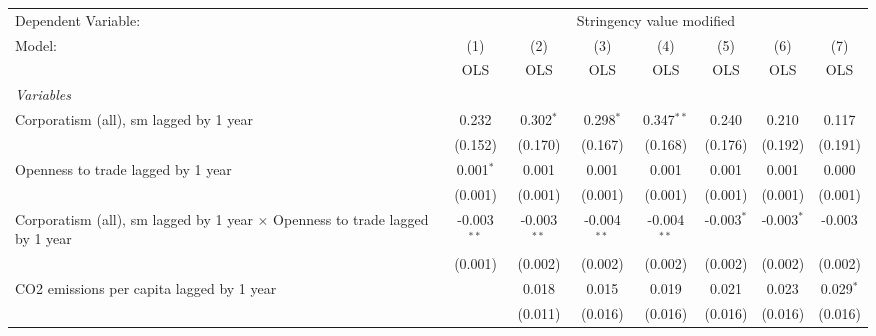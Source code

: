 
\begingroup
\centering
\begin{tabular}{lccccccc}
   \toprule
   Dependent Variable: & \multicolumn{7}{c}{Stringency value modified}\\
   Model:                                                                              & (1)           & (2)           & (3)           & (4)           & (5)          & (6)          & (7)\\  
                                                                                       &  OLS          & OLS           & OLS           & OLS           & OLS          & OLS          & OLS\\  
   \midrule
   \emph{Variables}\\
   Corporatism (all), sm lagged by 1 year                                              & 0.232         & 0.302$^{*}$   & 0.298$^{*}$   & 0.347$^{**}$  & 0.240        & 0.210        & 0.117\\   
                                                                                       & (0.152)       & (0.170)       & (0.167)       & (0.168)       & (0.176)      & (0.192)      & (0.191)\\   
   Openness to trade lagged by 1 year                                                  & 0.001$^{*}$   & 0.001         & 0.001         & 0.001         & 0.001        & 0.001        & 0.000\\   
                                                                                       & (0.001)       & (0.001)       & (0.001)       & (0.001)       & (0.001)      & (0.001)      & (0.001)\\   
   Corporatism (all), sm lagged by 1 year $\times$ Openness to trade lagged by 1 year  & -0.003$^{**}$ & -0.003$^{**}$ & -0.004$^{**}$ & -0.004$^{**}$ & -0.003$^{*}$ & -0.003$^{*}$ & -0.003\\   
                                                                                       & (0.001)       & (0.002)       & (0.002)       & (0.002)       & (0.002)      & (0.002)      & (0.002)\\   
   CO2 emissions per capita lagged by 1 year                                           &               & 0.018         & 0.015         & 0.019         & 0.021        & 0.023        & 0.029$^{*}$\\   
                                                                                       &               & (0.011)       & (0.016)       & (0.016)       & (0.016)      & (0.016)      & (0.016)\\   

\end{tabular}
